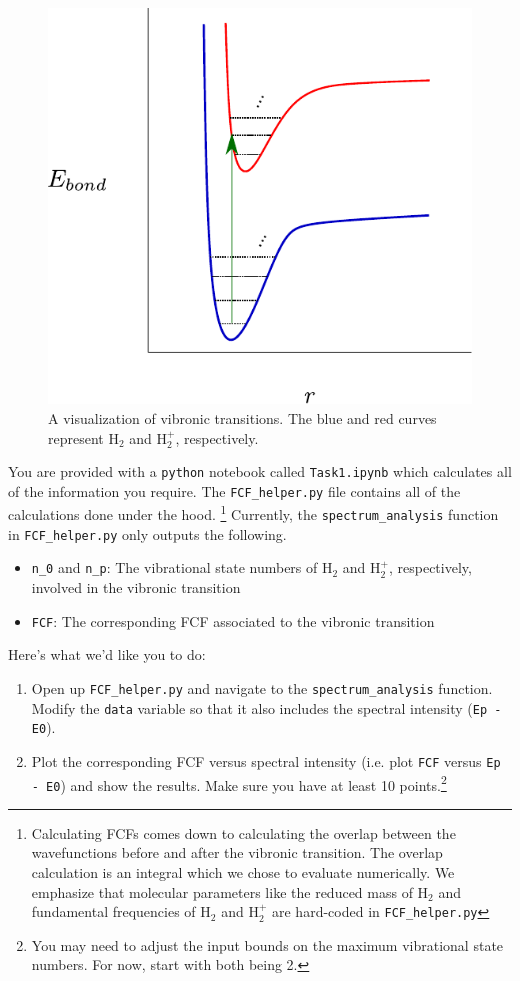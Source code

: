 \documentclass[12pt]{article}
\begin{document}
\begin{figure} \label{fig:visualize_vibronic}
    \begin{center}
        \includegraphics[width=0.5\linewidth]{../figures/potential_energy_curve.pdf}
    \end{center}
    \caption{A visualization of vibronic transitions. The blue and red curves represent H$_2$ and H$_2^+$, respectively.}
\end{figure}

You are provided with a \texttt{python} notebook called \texttt{Task1.ipynb} which calculates all of the information you require. The \texttt{FCF\_helper.py} file contains all of the calculations done under the hood. \footnote{Calculating FCFs comes down to calculating the overlap between the wavefunctions before and after the vibronic transition. The overlap calculation is an integral which we chose to evaluate numerically. We emphasize that molecular parameters like the reduced mass of H$_2$ and fundamental frequencies of H$_2$ and H$_2^+$ are hard-coded in \texttt{FCF\_helper.py}} Currently, the \texttt{spectrum\_analysis} function in \texttt{FCF\_helper.py} only outputs the following.
\begin{itemize}
    \item \texttt{n\_0} and \texttt{n\_p}: The vibrational state numbers of H$_2$ and H$_2^+$, respectively, involved in the vibronic transition
    \item \texttt{FCF}: The corresponding FCF associated to the vibronic transition
\end{itemize}
Here's what we'd like you to do:
\begin{enumerate}
    \item Open up \texttt{FCF\_helper.py} and navigate to the \texttt{spectrum\_analysis} function. Modify the \texttt{data} variable so that it also includes the spectral intensity (\texttt{Ep - E0}).
    \item Plot the corresponding FCF versus spectral intensity (i.e. plot \texttt{FCF} versus \texttt{Ep - E0}) and show the results. Make sure you have at least 10 points.\footnote{You may need to adjust the input bounds on the maximum vibrational state numbers. For now, start with both being 2.}
\end{enumerate}
\end{document}
